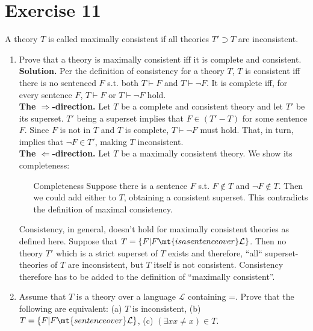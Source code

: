 \section{Exercise 11}

A theory $T$ is called maximally consistent if all theories $T' \supset T$ are inconsistent.

\begin{enumerate}
	\item Prove that a theory is maximally consistent iff it is complete and consistent.\\
	
	\noindent
	\textbf{Solution.} 
	Per the definition of consistency for a theory $T$, $T$ is consistent iff there is no sentenced $F$ s.t. both $T \vdash F$ and $T \vdash \neg F$.
	It is complete iff, for every sentence $F$, $T \vdash F$ or $T \vdash \neg F$ hold.\\
	
	\textbf{The $\Rightarrow$-direction.} Let $T$ be a complete and consistent theory and let $T'$ be its superset. $T'$ being a superset implies that $F \in (T' - T)$ for some sentence $F$. Since $F$ is not in $T$ and $T$ is complete, $T \vdash \neg F$ must hold. That, in turn, implies that $\neg F \in T'$, making $T$ inconsistent.\\
	
	\textbf{The $\Leftarrow$-direction.} Let $T$ be a maximally consistent theory. We show its completeness:
		\begin{itemize}
			\item[Completeness] Suppose there is a sentence $F$ s.t. $F \notin T$ and $\neg F \notin T$. Then we could add either to $T$, obtaining a consistent superset. This contradicts the definition of maximal consistency.
		\end{itemize}
		
	Consistency, in general, doesn't hold for maximally consistent theories as defined here. Suppose that $T = \{ F | F \mt{ is a sentence over } \mathcal{L} \}$. Then no theory $T'$ which is a strict superset of $T$ exists and therefore, ``all`` superset-theories of $T$ are inconsistent, but $T$ itself is not consistent. Consistency therefore has to be added to the definition of ``maximally consistent''.

	\item Assume that $T$ is a theory over a language $\mathcal{L}$ containing =. Prove that the following are equivalent: (a) $T$ is inconsistent, (b) $T = \{F | F \mt{ sentence over } \mathcal{L} \}$, (c) $(\exists x x \neq x) \in T$.\\
	

\end{enumerate}
